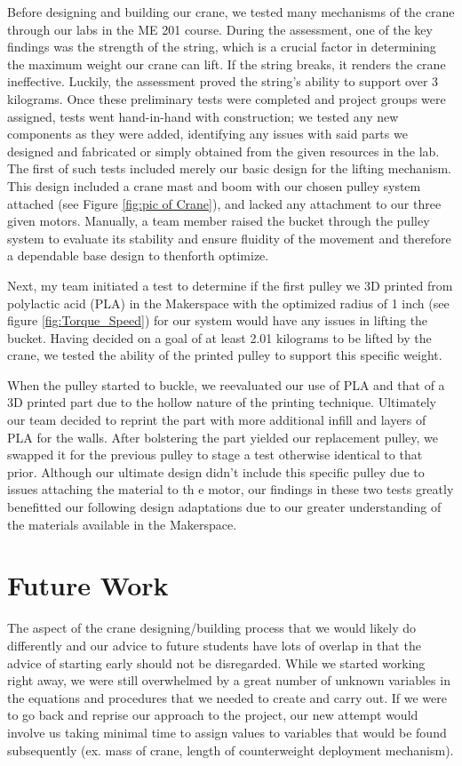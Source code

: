 \documentclass[letterpaper, 12pt]{article}
\begin{document}
Before designing and building our crane, we tested many mechanisms of the crane through our labs in the ME 201 course. 
During the assessment, one of the key findings was the strength of the string, which is a crucial factor in determining the maximum weight our crane can lift. 
If the string breaks, it renders the crane ineffective.
Luckily, the assessment proved the string’s ability to support over 3 kilograms.
Once these preliminary tests were completed and project groups were assigned, tests went hand-in-hand with construction; we tested any new components as they were added, identifying any issues with said parts we designed and fabricated or simply obtained from the given resources in the lab. 
The first of such tests included merely our basic design for the lifting mechanism. 
This design included a crane mast and boom with our chosen pulley system attached (see Figure \ref{fig:pic of Crane}), and lacked any attachment to our three given motors. 
Manually, a team member raised the bucket through the pulley system to evaluate its stability and ensure fluidity of the movement and therefore a dependable base design to thenforth optimize. 

Next, my team initiated a test to determine if the first pulley we 3D printed from polylactic acid (PLA) in the Makerspace with the optimized radius of 1 inch (see figure \ref{fig:Torque_Speed}) for our system would have any issues in lifting the bucket. 
Having decided on a goal of at least 2.01 kilograms to be lifted by the crane, we tested the ability of the printed pulley to support this specific weight. 

When the pulley started to buckle, we reevaluated our use of PLA and that of a 3D printed part due to the hollow nature of the printing technique. 
Ultimately our team decided to reprint the part with more additional infill and layers of PLA for the walls. 
After bolstering the part yielded our replacement pulley, we swapped it for the previous pulley to stage a test otherwise identical to that prior. 
Although our ultimate design didn’t include this specific pulley due to issues attaching the material to th e motor, our findings in these two tests greatly benefitted our following design adaptations due to our greater understanding of the materials available in the Makerspace.


\section{Future Work}
The aspect of the crane designing/building process that we would likely do differently and our advice to future students have lots of overlap in that the advice of starting early should not be disregarded. 
While we started working right away, we were still overwhelmed by a great number of unknown variables in the equations and procedures that we needed to create and carry out. 
If we were to go back and reprise our approach to the project, our new attempt would involve us taking minimal time to assign values to variables that would be found subsequently (ex. mass of crane, length of counterweight deployment mechanism).
\end{document}

